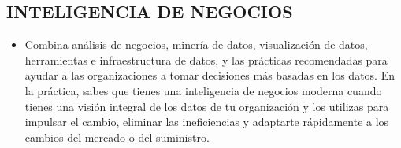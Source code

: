 \documentclass[twoside,twocolumn]{article}
\begin{document}
\subsection{INTELIGENCIA DE NEGOCIOS}
\begin{itemize}
\item Combina análisis de negocios, minería de datos, visualización de datos, herramientas e infraestructura de datos, y las prácticas recomendadas para ayudar a las organizaciones a tomar decisiones más basadas en los datos. En la práctica, sabes que tienes una inteligencia de negocios moderna cuando tienes una visión integral de los datos de tu organización y los utilizas para impulsar el cambio, eliminar las ineficiencias y adaptarte rápidamente a los cambios del mercado o del suministro.
\newline
 
\end{itemize}
\end{document}
